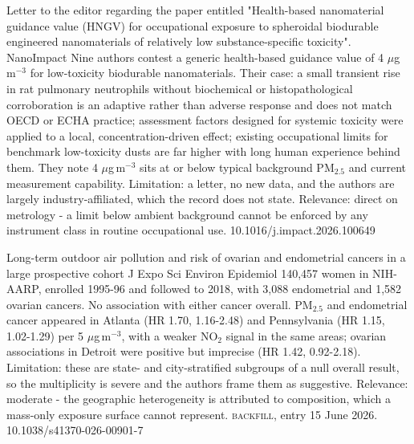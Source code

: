 \documentclass[10pt]{article}
\begin{document}
{Letter to the editor regarding the paper entitled "Health-based nanomaterial guidance value (HNGV) for occupational exposure to spheroidal biodurable engineered nanomaterials of relatively low substance-specific toxicity".}
{NanoImpact}
{Nine authors contest a generic health-based guidance value of 4 $\mu$g\,m$^{-3}$ for low-toxicity biodurable nanomaterials. Their case: a small transient rise in rat pulmonary neutrophils without biochemical or histopathological corroboration is an adaptive rather than adverse response and does not match OECD or ECHA practice; assessment factors designed for systemic toxicity were applied to a local, concentration-driven effect; existing occupational limits for benchmark low-toxicity dusts are far higher with long human experience behind them. They note 4 $\mu$g\,m$^{-3}$ sits at or below typical background PM$_{2.5}$ and current measurement capability. Limitation: a letter, no new data, and the authors are largely industry-affiliated, which the record does not state. Relevance: direct on metrology - a limit below ambient background cannot be enforced by any instrument class in routine occupational use.}
{10.1016/j.impact.2026.100649}

\par{}\baselineskip{}\baselineskip
{}

{Long-term outdoor air pollution and risk of ovarian and endometrial cancers in a large prospective cohort}
{J Expo Sci Environ Epidemiol}
{140,457 women in NIH-AARP, enrolled 1995-96 and followed to 2018, with 3,088 endometrial and 1,582 ovarian cancers. No association with either cancer overall. PM$_{2.5}$ and endometrial cancer appeared in Atlanta (HR 1.70, 1.16-2.48) and Pennsylvania (HR 1.15, 1.02-1.29) per 5 $\mu$g\,m$^{-3}$, with a weaker NO$_2$ signal in the same areas; ovarian associations in Detroit were positive but imprecise (HR 1.42, 0.92-2.18). Limitation: these are state- and city-stratified subgroups of a null overall result, so the multiplicity is severe and the authors frame them as suggestive. Relevance: moderate - the geographic heterogeneity is attributed to composition, which a mass-only exposure surface cannot represent. \textsc{backfill}, entry 15 June 2026.}
{10.1038/s41370-026-00901-7}
\end{document}
